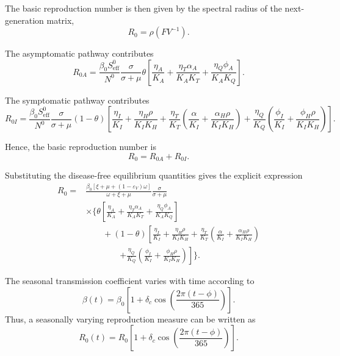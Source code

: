 \documentclass[12pt,a4paper]{article}
\theoremstyle{definition}
\theoremstyle{remark}
\begin{document}
The basic reproduction number is then given by the spectral radius of the next-generation matrix,
\begin{equation}
R_0=\rho(FV^{-1}).
\end{equation}

The asymptomatic pathway contributes
\begin{equation}
R_{0A}
=
\frac{\beta_0S_{\mathrm{eff}}^0}{N^0}
\frac{\sigma}{\sigma+\mu}
\theta
\left[
\frac{\eta_A}{K_A}
+
\frac{\eta_T\alpha_A}{K_AK_T}
+
\frac{\eta_Q\phi_A}{K_AK_Q}
\right].
\end{equation}

The symptomatic pathway contributes
\begin{equation}
R_{0I}
=
\frac{\beta_0S_{\mathrm{eff}}^0}{N^0}
\frac{\sigma}{\sigma+\mu}
(1-\theta)
\left[
\frac{\eta_I}{K_I}
+
\frac{\eta_H\rho}{K_IK_H}
+
\frac{\eta_T}{K_T}
\left(
\frac{\alpha}{K_I}
+
\frac{\alpha_H\rho}{K_IK_H}
\right)
+
\frac{\eta_Q}{K_Q}
\left(
\frac{\phi_I}{K_I}
+
\frac{\phi_H\rho}{K_IK_H}
\right)
\right].
\end{equation}

Hence, the basic reproduction number is
\begin{equation}
\boxed{
R_0=R_{0A}+R_{0I}.
}
\end{equation}

Substituting the disease-free equilibrium quantities gives the explicit expression
\begin{equation}
\boxed{
\begin{aligned}
R_0={}&
\frac{\beta_0
\left[\xi+\mu+(1-\varepsilon_V)\omega\right]}
{\omega+\xi+\mu}
\frac{\sigma}{\sigma+\mu}
\\
&\times
\Bigg\{
\theta
\left[
\frac{\eta_A}{K_A}
+
\frac{\eta_T\alpha_A}{K_AK_T}
+
\frac{\eta_Q\phi_A}{K_AK_Q}
\right]
\\
&\qquad +(1-\theta)
\left[
\frac{\eta_I}{K_I}
+
\frac{\eta_H\rho}{K_IK_H}
+
\frac{\eta_T}{K_T}
\left(
\frac{\alpha}{K_I}
+
\frac{\alpha_H\rho}{K_IK_H}
\right)
\right.
\\
&\qquad\qquad\left.
+
\frac{\eta_Q}{K_Q}
\left(
\frac{\phi_I}{K_I}
+
\frac{\phi_H\rho}{K_IK_H}
\right)
\right]
\Bigg\}.
\end{aligned}
}
\label{eq:flu_R0}
\end{equation}

The seasonal transmission coefficient varies with time according to
\[
\beta(t)=
\beta_0
\left[
1+\delta_c
\cos\left(
\frac{2\pi(t-\phi)}{365}
\right)
\right].
\]
Thus, a seasonally varying reproduction measure can be written as
\begin{equation}
R_0(t)
=
R_0
\left[
1+\delta_c
\cos\left(
\frac{2\pi(t-\phi)}{365}
\right)
\right].
\end{equation}
\end{document}
